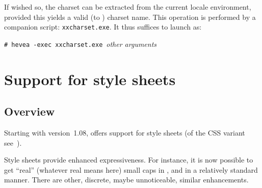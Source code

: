 %
If wished so, the charset can be extracted from the current
locale environment, provided this yields a valid (to \hevea) charset name.
This operation is performed by a companion script: \texttt{xxcharset.exe}.
It thus suffices to launch \hevea{} as:
\begin{flushleft}
\texttt{\# hevea -exec xxcharset.exe}~\textit{other arguments} 
\end{flushleft}

\section{Support\label{style:sheets} for style sheets}

\subsection{Overview}
Starting with version~1.08, \hevea{} offers support for style sheets
(of the CSS variant see~\cite{css}).

Style sheets provide enhanced expressiveness. For instance, it is now possible
to get ``real'' (whatever real means here) small caps in {\html}, and in a
relatively standard manner. There are other, discrete, maybe
unnoticeable, similar enhancements.

